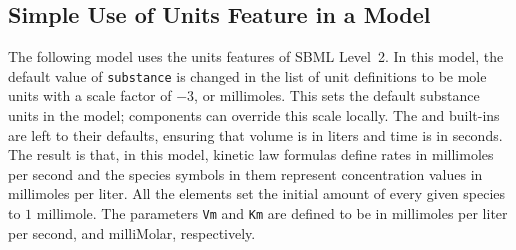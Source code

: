 \documentclass[10pt,twocolumntoc]{cekarticle}
\begin{document}
\subsection{Simple Use of Units Feature in a Model}
\label{apdx:units-eg}

The following model uses the units features of SBML Level~2.  In
this model, the default value of \texttt{substance} is changed in
the list of unit definitions to be mole units with a scale factor
of $-3$, or millimoles.  This sets the default substance units in
the model; components can override this scale locally.  The
 and  built-ins are left to their
defaults, ensuring that volume is in liters and time is in
seconds.  The result is that, in this model, kinetic law formulas
define rates in millimoles per second and the species symbols in
them represent concentration values in millimoles per liter.  All
the  elements set the initial amount of every given
species to $1$ millimole.  The parameters \texttt{Vm} and
\texttt{Km} are defined to be in millimoles per liter per second,
and milliMolar, respectively.
\end{document}
